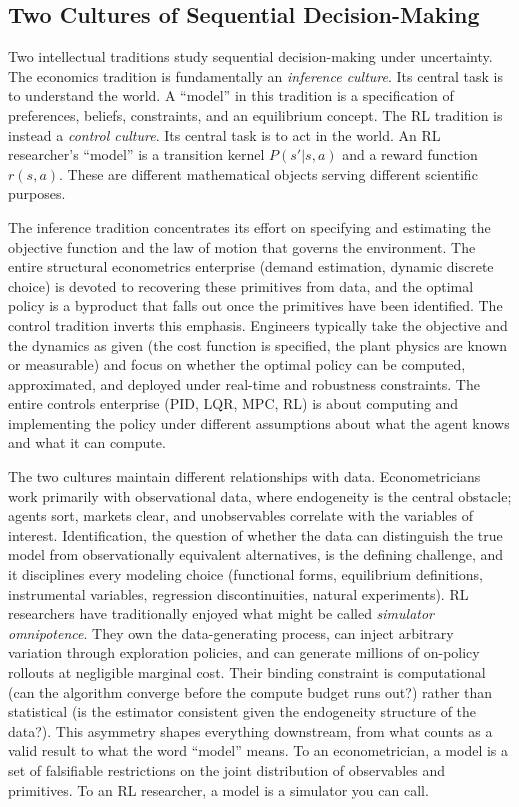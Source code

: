 \subsection{Two Cultures of Sequential Decision-Making}
\label{section:language}

Two intellectual traditions study sequential decision-making under uncertainty. The economics tradition is fundamentally an \textit{inference culture}. Its central task is to understand the world. A ``model'' in this tradition is a specification of preferences, beliefs, constraints, and an equilibrium concept. The RL tradition is instead a \textit{control culture}. Its central task is to act in the world. An RL researcher's ``model'' is a transition kernel $P(s'|s,a)$ and a reward function $r(s,a)$. These are different mathematical objects serving different scientific purposes.

The inference tradition concentrates its effort on specifying and estimating the objective function and the law of motion that governs the environment. The entire structural econometrics enterprise (demand estimation, dynamic discrete choice) is devoted to recovering these primitives from data, and the optimal policy is a byproduct that falls out once the primitives have been identified. The control tradition inverts this emphasis. Engineers typically take the objective and the dynamics as given (the cost function is specified, the plant physics are known or measurable) and focus on whether the optimal policy can be computed, approximated, and deployed under real-time and robustness constraints. The entire controls enterprise (PID, LQR, MPC, RL) is about computing and implementing the policy under different assumptions about what the agent knows and what it can compute.

The two cultures maintain different relationships with data. Econometricians work primarily with observational data, where endogeneity is the central obstacle; agents sort, markets clear, and unobservables correlate with the variables of interest. Identification, the question of whether the data can distinguish the true model from observationally equivalent alternatives, is the defining challenge, and it disciplines every modeling choice (functional forms, equilibrium definitions, instrumental variables, regression discontinuities, natural experiments). RL researchers have traditionally enjoyed what might be called \textit{simulator omnipotence}. They own the data-generating process, can inject arbitrary variation through exploration policies, and can generate millions of on-policy rollouts at negligible marginal cost. Their binding constraint is computational (can the algorithm converge before the compute budget runs out?) rather than statistical (is the estimator consistent given the endogeneity structure of the data?). This asymmetry shapes everything downstream, from what counts as a valid result to what the word ``model'' means. To an econometrician, a model is a set of falsifiable restrictions on the joint distribution of observables and primitives. To an RL researcher, a model is a simulator you can call.

